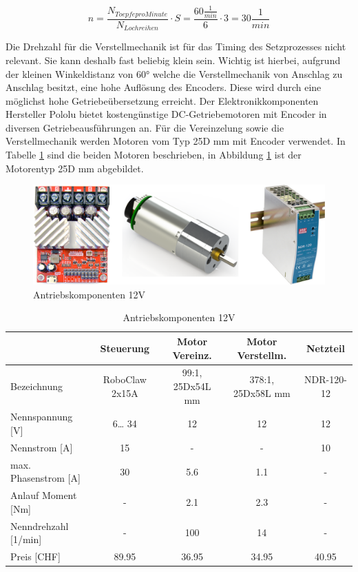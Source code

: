 \begin{equation}
	n = \frac{ N_{Toepfe pro Minute}}{ N_{Lochreihen}} \cdot S  = \frac{60\frac{1}{min}}{6} \cdot 3 = 30\frac{1}{min}
\end{equation}

Die Drehzahl für die Verstellmechanik ist für das Timing des Setzprozesses nicht relevant. Sie kann deshalb fast beliebig klein sein. Wichtig ist hierbei, aufgrund der kleinen Winkeldistanz von 60° welche die Verstellmechanik von Anschlag zu Anschlag besitzt, eine hohe Auflösung des Encoders. Diese wird durch eine möglichst hohe Getriebeübersetzung erreicht. Der Elektronikkomponenten Hersteller Pololu bietet kostengünstige DC-Getriebemotoren mit Encoder in diversen Getriebeausführungen an. Für die Vereinzelung sowie die Verstellmechanik werden Motoren vom Typ 25D mm mit Encoder verwendet. In Tabelle \ref{tab:12V_Antriebskomponenten} sind die beiden Motoren beschrieben, in Abbildung \ref{fig:12V_Antriebskomponenten} ist der Motorentyp 25D mm abgebildet.

\begin{figure}[H]
	\includegraphics[width=1\textwidth]{Illustrationen/5-Konzept/12V_Antriebskomponenten.png}
	\caption{Antriebskomponenten 12V \protect\cite{ION_Motion} \protect\cite{Pololu_Motors} \protect\cite{12V_Netzteil}}
	\label{fig:12V_Antriebskomponenten}
\end{figure}

\begin{table}[H]
	\footnotesize
	\centering
	\caption{Antriebskomponenten 12V \protect\cite{ION_Motion} \protect\cite{Pololu_Motors} \protect\cite{12V_Netzteil}}
	\begin{tabular}{|l|c|c|c|c|}
		\hline
		& \textbf{Steuerung} & \textbf{Motor Vereinz.} & \textbf{Motor Verstellm.} & \textbf{Netzteil} \\
		\hline
		Bezeichnung & RoboClaw 2x15A & 99:1, 25Dx54L mm & 378:1, 25Dx58L mm & NDR-120-12 \\
		\hline
		Nennspannung [V] & 6… 34 & 12    & 12    & 12 \\
		\hline
		Nennstrom [A] & 15    & -     & -     & 10 \\
		\hline
		max. Phasenstrom [A] & 30    & 5.6   & 1.1   & - \\
		\hline
		Anlauf Moment [Nm] & -     & 2.1   & 2.3   & - \\
		\hline
		Nenndrehzahl [1/min] & -     & 100   & 14    & - \\
		\hline
		Preis [CHF] & 89.95 & 36.95 & 34.95 & 40.95 \\
		\hline
	\end{tabular}
	\label{tab:12V_Antriebskomponenten}
\end{table}

